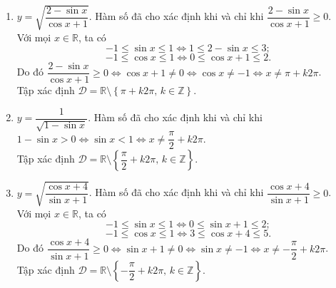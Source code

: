 \begin{bt}
{\begin{enumerate}
		Tập xác định $\mathscr{D}=\mathbb{R}\setminus\left\lbrace k\dfrac{\pi}{2},\, k\in \mathbb{Z} \right\rbrace$.\\
		\item $y=\sqrt{\dfrac{2-\sin x}{\cos x+1}}$.
		Hàm số đã cho xác định khi và chỉ khi $\dfrac{2-\sin x}{\cos x+1}\geq 0$.\\
		Với mọi $x\in \mathbb{R}$, ta có
		$$-1\leq \sin x\leq 1\Leftrightarrow  1\leq 2-\sin x\leq 3;$$
		$$-1\leq \cos x\leq 1\Leftrightarrow 0\leq \cos x+1\leq 2.$$
		Do đó
		$\dfrac{2-\sin x}{\cos x+1}\geq 0\Leftrightarrow \cos x+1\neq 0 \Leftrightarrow \cos x\neq -1\Leftrightarrow
		 x\neq \pi +k2\pi$.\\
		Tập xác định $\mathscr{D}=\mathbb{R}\setminus\left\lbrace \pi +k2\pi, \, k\in \mathbb{Z} \right\rbrace$.\\
		\item $y=\dfrac{1}{\sqrt{1-\sin x}}$.
		Hàm số đã cho xác định khi và chỉ khi\\
		$1-\sin x>0\Leftrightarrow \sin x<1\Leftrightarrow x\neq \dfrac{\pi}{2}+k2\pi.$\\
		Tập xác định $\mathscr{D}=\mathbb{R}\setminus\left\lbrace \dfrac{\pi}{2}+k2\pi, \, k\in \mathbb{Z} \right\rbrace$.\\
		\item $y=\sqrt{\dfrac{\cos x+4}{\sin x+1}}$.
		Hàm số đã cho xác định khi và chỉ khi $\dfrac{\cos x+4}{\sin x+1}\geq 0$.\\
		Với mọi $x\in \mathbb{R}$, ta có
		$$-1\leq \sin x\leq 1\Leftrightarrow  0\leq \sin x+1\leq 2;$$
		$$-1\leq \cos x\leq 1\Leftrightarrow 3\leq \cos x+4\leq 5.$$
		Do đó
		$\dfrac{\cos x+4}{\sin x+1}\geq 0\Leftrightarrow \sin x+1\neq 0 \Leftrightarrow \sin x\neq -1\Leftrightarrow
		x\neq -\dfrac{\pi}{2} +k2\pi$.\\
		Tập xác định $\mathscr{D}=\mathbb{R}\setminus\left\lbrace -\dfrac{\pi}{2} +k2\pi, \, k\in \mathbb{Z} \right\rbrace$.\\

\end{enumerate}}
\end{bt}
